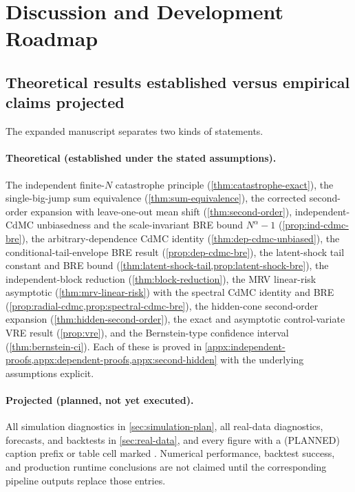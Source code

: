 \section{Discussion and Development Roadmap}
\label{sec:discussion}

\subsection{Theoretical results established versus empirical claims projected}

The expanded manuscript separates two kinds of statements.

\paragraph{Theoretical (established under the stated assumptions).}
The independent finite-$N$ catastrophe principle
(\cref{thm:catastrophe-exact}), the single-big-jump sum equivalence
(\cref{thm:sum-equivalence}), the corrected second-order expansion with
leave-one-out mean shift (\cref{thm:second-order}), independent-CdMC
unbiasedness and the scale-invariant BRE bound $N^\alpha-1$
(\cref{prop:ind-cdmc-bre}), the arbitrary-dependence CdMC identity
(\cref{thm:dep-cdmc-unbiased}), the conditional-tail-envelope BRE result
(\cref{prop:dep-cdmc-bre}), the latent-shock tail constant and BRE bound
(\cref{thm:latent-shock-tail,prop:latent-shock-bre}), the independent-block
reduction (\cref{thm:block-reduction}), the MRV linear-risk asymptotic
(\cref{thm:mrv-linear-risk}) with the spectral CdMC identity and BRE
(\cref{prop:radial-cdmc,prop:spectral-cdmc-bre}), the hidden-cone second-order
expansion (\cref{thm:hidden-second-order}), the exact and asymptotic
control-variate VRE result (\cref{prop:vre}), and the Bernstein-type
confidence interval (\cref{thm:bernstein-ci}). Each of these is proved in
\cref{appx:independent-proofs,appx:dependent-proofs,appx:second-hidden} with
the underlying assumptions explicit.

\paragraph{Projected (planned, not yet executed).}
All simulation diagnostics in \cref{sec:simulation-plan}, all real-data
diagnostics, forecasts, and backtests in \cref{sec:real-data}, and every
figure with a (PLANNED) caption prefix or table cell marked \xx{}. Numerical
performance, backtest success, and production runtime conclusions are not
claimed until the corresponding pipeline outputs replace those entries.

